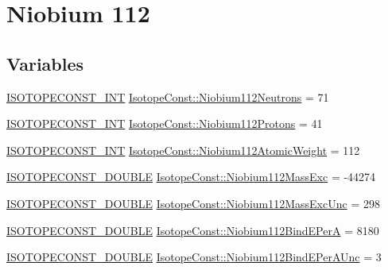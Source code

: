 \hypertarget{group___isotope_const-_niobium-_nb112}{}\section{Niobium 112}
\label{group___isotope_const-_niobium-_nb112}
\subsection*{Variables}
\begin{DoxyCompactItemize}
\item 
\mbox{\hyperlink{group___isotope_const-_macros_ga5f18360b3e99483a35c32d789e62621c}{I\+S\+O\+T\+O\+P\+E\+C\+O\+N\+S\+T\+\_\+\+I\+NT}} \mbox{\hyperlink{group___isotope_const-_niobium-_nb112_ga12b7d29a07bc2ecd879ed9b3eb1e83b5}{Isotope\+Const\+::\+Niobium112\+Neutrons}} = 71
\item 
\mbox{\hyperlink{group___isotope_const-_macros_ga5f18360b3e99483a35c32d789e62621c}{I\+S\+O\+T\+O\+P\+E\+C\+O\+N\+S\+T\+\_\+\+I\+NT}} \mbox{\hyperlink{group___isotope_const-_niobium-_nb112_gaf620512abbc8eaf4c5166a095dcbd4bd}{Isotope\+Const\+::\+Niobium112\+Protons}} = 41
\item 
\mbox{\hyperlink{group___isotope_const-_macros_ga5f18360b3e99483a35c32d789e62621c}{I\+S\+O\+T\+O\+P\+E\+C\+O\+N\+S\+T\+\_\+\+I\+NT}} \mbox{\hyperlink{group___isotope_const-_niobium-_nb112_ga45f096cd2d49c8761bc265c5d7b191a7}{Isotope\+Const\+::\+Niobium112\+Atomic\+Weight}} = 112
\item 
\mbox{\hyperlink{group___isotope_const-_macros_ga8f45a7272ce02c0b4c65c44636ed719a}{I\+S\+O\+T\+O\+P\+E\+C\+O\+N\+S\+T\+\_\+\+D\+O\+U\+B\+LE}} \mbox{\hyperlink{group___isotope_const-_niobium-_nb112_gac75bae23891ebbcb8072b0b0d0af546f}{Isotope\+Const\+::\+Niobium112\+Mass\+Exc}} = -\/44274
\item 
\mbox{\hyperlink{group___isotope_const-_macros_ga8f45a7272ce02c0b4c65c44636ed719a}{I\+S\+O\+T\+O\+P\+E\+C\+O\+N\+S\+T\+\_\+\+D\+O\+U\+B\+LE}} \mbox{\hyperlink{group___isotope_const-_niobium-_nb112_ga366752cdfbcd4cf9f9936d592781718d}{Isotope\+Const\+::\+Niobium112\+Mass\+Exc\+Unc}} = 298
\item 
\mbox{\hyperlink{group___isotope_const-_macros_ga8f45a7272ce02c0b4c65c44636ed719a}{I\+S\+O\+T\+O\+P\+E\+C\+O\+N\+S\+T\+\_\+\+D\+O\+U\+B\+LE}} \mbox{\hyperlink{group___isotope_const-_niobium-_nb112_ga43c77077afc49ff552015e445d9bc526}{Isotope\+Const\+::\+Niobium112\+Bind\+E\+PerA}} = 8180
\item 
\mbox{\hyperlink{group___isotope_const-_macros_ga8f45a7272ce02c0b4c65c44636ed719a}{I\+S\+O\+T\+O\+P\+E\+C\+O\+N\+S\+T\+\_\+\+D\+O\+U\+B\+LE}} \mbox{\hyperlink{group___isotope_const-_niobium-_nb112_ga8aa90e7cef2c853a9419050750a87100}{Isotope\+Const\+::\+Niobium112\+Bind\+E\+Per\+A\+Unc}} = 3

\end{DoxyCompactItemize}
